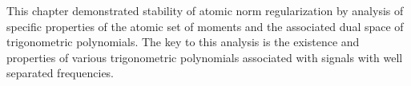 This chapter demonstrated stability of atomic norm regularization by
analysis of specific properties of the atomic set of moments and the associated
dual space of trigonometric polynomials. The key to this analysis is the
existence and properties of various trigonometric polynomials associated with
signals with well separated frequencies.



	

